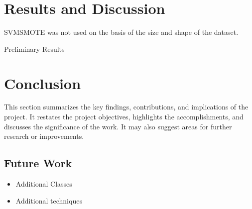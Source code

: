 \documentclass[journal]{IEEEtran}
\begin{document}
	\section{Results and Discussion}
	\label{sec:results_discussion}
	SVMSMOTE was not used on the basis of the size and shape of the dataset.
	
	Preliminary Results
	
	
	\section{Conclusion}
	\label{sec:conclusion}
	This section summarizes the key findings, contributions, and implications of the project. It restates the project objectives, highlights the accomplishments, and discusses the significance of the work. It may also suggest areas for further research or improvements.
	
	\subsection{Future Work}
	\begin{itemize}
		\item Additional Classes
		\item Additional techniques
	\end{itemize}
	
	
	\label{sec:references}
	
	
	
\end{document}
